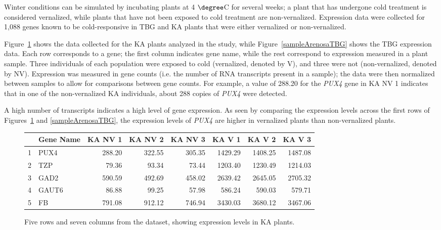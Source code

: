 Winter conditions can be simulated by incubating plants at 4 $\degree$C for several weeks; a plant that has undergone cold treatment is considered vernalized, while plants that have not been exposed to cold treatment are non-vernalized. Expression data were collected for 1,088 genes known to be cold-responsive in TBG and KA plants that were either vernalized or non-vernalized. 

Figure~\ref{sampleArenosaKA} shows the data collected for the KA plants analyzed in the study, while Figure~\ref{sampleArenosaTBG} shows the TBG expression data. Each row corresponds to a gene; the first column indicates gene name, while the rest correspond to expression measured in a plant sample. Three individuals of each population were exposed to cold (vernalized, denoted by V), and three were not (non-vernalized, denoted by NV). Expression was measured in gene counts (i.e. the number of RNA transcripts present in a sample); the data were then normalized between samples to allow for comparisons between gene counts. For example, a value of 288.20 for the \textit{PUX4} gene in KA NV 1 indicates that in one of the non-vernalized KA individuals, about 288 copies of \textit{PUX4} were detected.

A high number of transcripts indicates a high level of gene expression. As seen by comparing the expression levels across the first rows of Figures~\ref{sampleArenosaKA} and \ref{sampleArenosaTBG}, the expression levels of \textit{PUX4} are higher in vernalized plants than non-vernalized plants.

\begin{figure}[h]
	\centering
	\begin{tabular}{rlrrrrrr}
		\hline
		& Gene Name & KA NV 1 & KA NV 2 & KA NV 3 & KA V 1 & KA V 2 & KA V 3 \\ 
		\hline
		1 & PUX4 & 288.20 & 322.55 & 305.35 & 1429.29 & 1408.25 & 1487.08 \\ 
		2 & TZP & 79.36 & 93.34 & 73.44 & 1203.40 & 1230.49 & 1214.03 \\ 
		3 & GAD2 & 590.59 & 492.69 & 458.02 & 2639.42 & 2645.05 & 2705.32 \\ 
		4 & GAUT6 & 86.88 & 99.25 & 57.98 & 586.24 & 590.03 & 579.71 \\ 
		5 & FB & 791.08 & 912.12 & 746.94 & 3430.03 & 3680.12 & 3467.06 \\ 
		\hline
	\end{tabular}
	\caption{Five rows and seven columns from the  dataset, showing expression levels in KA plants.} 
	\label{sampleArenosaKA}
\end{figure}

